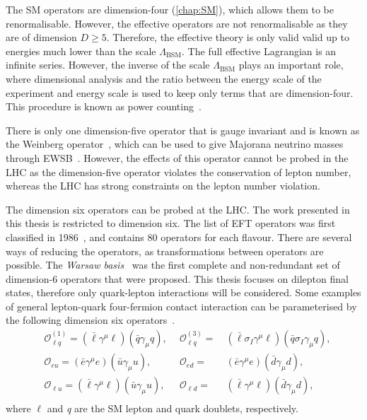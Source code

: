 The SM operators are dimension-four (\cref{chap:SM}), which allows them to be renormalisable.  However, the effective operators are not renormalisable as they are of dimension $D \geq 5$. Therefore, the effective theory is only valid valid up to energies much lower than the scale $\Lambda_\mathrm{BSM}$. The full effective Lagrangian is an infinite series. However, the inverse of the scale $\Lambda_\mathrm{BSM}$ plays an important role, where dimensional analysis and the ratio between the energy scale of the experiment and energy scale  is used to keep only terms that are dimension-four. This procedure is known as power counting~\cite{Contino_2016}. 

There is only one dimension-five operator that is gauge invariant and is known as the Weinberg operator~\cite{Weinberg:1979sa}, which can be used to give Majorana neutrino masses through EWSB~\cite{Jenkins_2018}. However, the effects of this operator cannot be probed in the LHC as the dimension-five operator violates the conservation of lepton number, whereas the LHC has strong constraints on the lepton number violation.

The dimension six operators can be probed at the LHC. The work presented in this thesis is restricted to dimension six. The list of EFT operators was first classified in 1986~\cite{Buchmuller:163116}, and contains 80 operators for each flavour. There are several ways of reducing the operators, as transformations between operators are possible. The \emph{Warsaw basis}~\cite{Grzadkowski_2010} was the first complete and non-redundant set of dimension-6 operators that were proposed. This thesis focuses on dilepton final states, therefore only quark-lepton interactions will be considered. Some examples of general lepton-quark four-fermion contact interaction can be parameterised by the following dimension six operators~\cite{de_Blas_2013}.
\begin{equation}
    \label{eq:CIop}
    \begin{aligned}
        & \mathcal{O}^{(1)}_{\ell q} = (\bar{\ell}\gamma^\mu \ell)(\bar{q}\gamma_\mu q),~~ &\mathcal{O}^{(3)}_{\ell q} =& ~(\bar{\ell}\sigma_I\gamma^\mu \ell)(\bar{q}\sigma_I\gamma_\mu q), \\
        & \mathcal{O}_{eu} = (\bar{e}\gamma^\mu e)(\bar{u}\gamma_\mu u),~~ &\mathcal{O}_{e d} =& ~(\bar{e}\gamma^\mu e)(\bar{d}\gamma_\mu d), \\
        & \mathcal{O}_{\ell u} = (\bar{\ell}\gamma^\mu \ell)(\bar{u}\gamma_\mu u),~~ &\mathcal{O}_{\ell d} =& ~(\bar{\ell}\gamma^\mu \ell)(\bar{d}\gamma_\mu d), \\
     \end{aligned}
\end{equation}
where $\ell$ and  \emph{q} are the SM lepton and quark doublets, respectively.


